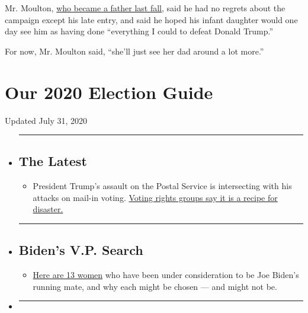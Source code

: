 Mr. Moulton,
\href{https://www.nytimes.com/2019/06/16/us/politics/democratic-candidates-fathers-day.html}{who
became a father last fall}, said he had no regrets about the campaign
except his late entry, and said he hoped his infant daughter would one
day see him as having done ``everything I could to defeat Donald
Trump.''

For now, Mr. Moulton said, ``she'll just see her dad around a lot
more.''

\hypertarget{our-2020-election-guide}{%
\section{Our 2020 Election Guide}\label{our-2020-election-guide}}

Updated July 31, 2020

\begin{itemize}
\item
  \begin{center}\rule{0.5\linewidth}{\linethickness}\end{center}

  \hypertarget{the-latest}{%
  \subsection{The Latest}\label{the-latest}}

  \begin{itemize}
  \tightlist
  \item
    President Trump's assault on the Postal Service is intersecting with
    his attacks on mail-in voting.
    \href{https://www.nytimes.com/2020/07/31/us/politics/trump-usps-mail-delays.html?action=click\&pgtype=Article\&state=default\&region=BELOW_MAIN_CONTENT\&context=storylines_guide}{Voting
    rights groups say it is a recipe for disaster.}
  \end{itemize}
\item
  \begin{center}\rule{0.5\linewidth}{\linethickness}\end{center}

  \hypertarget{bidens-vp-search}{%
  \subsection{Biden's V.P. Search}\label{bidens-vp-search}}

  \begin{itemize}
  \tightlist
  \item
    \href{https://www.nytimes.com/article/biden-vice-president-2020.html?action=click\&pgtype=Article\&state=default\&region=BELOW_MAIN_CONTENT\&context=storylines_guide}{Here
    are 13 women} who have been under consideration to be Joe Biden's
    running mate, and why each might be chosen --- and might not be.
  \end{itemize}
\item
  \begin{center}\rule{0.5\linewidth}{\linethickness}\end{center}


\end{itemize}
